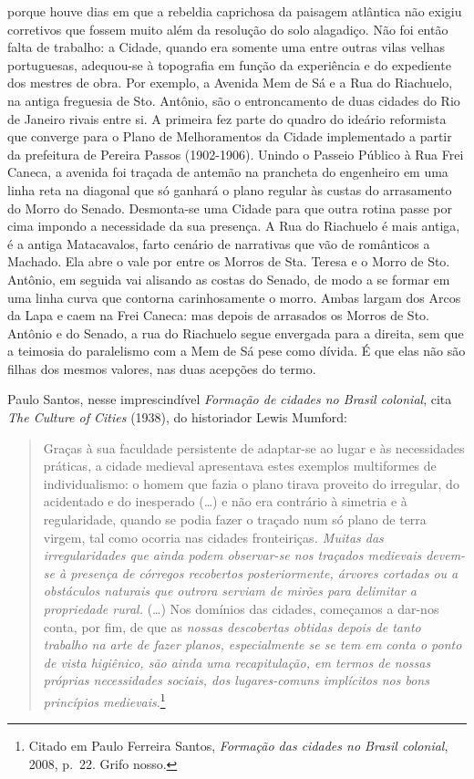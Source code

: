 porque houve dias em que a rebeldia caprichosa da paisagem atlântica não
exigiu corretivos que fossem muito além da resolução do solo alagadiço.
Não foi então falta de trabalho: a Cidade, quando era somente uma entre
outras vilas velhas portuguesas, adequou-se à topografia em função da
experiência e do expediente dos mestres de obra. Por exemplo, a Avenida
Mem de Sá e a Rua do Riachuelo, na antiga freguesia de Sto. Antônio, são
o entroncamento de duas cidades do Rio de Janeiro rivais entre si. A
primeira fez parte do quadro do ideário reformista que converge para o
Plano de Melhoramentos da Cidade implementado a partir da prefeitura de
Pereira Passos (1902-1906). Unindo o Passeio Público à Rua Frei Caneca,
a avenida foi traçada de antemão na prancheta do engenheiro em uma linha
reta na diagonal que só ganhará o plano regular às custas do arrasamento
do Morro do Senado. Desmonta-se uma Cidade para que outra rotina passe
por cima impondo a necessidade da sua presença. A Rua do Riachuelo é
mais antiga, é a antiga Matacavalos, farto cenário de narrativas que vão
de românticos a Machado. Ela abre o vale por entre os Morros de Sta.
Teresa e o Morro de Sto. Antônio, em seguida vai alisando as costas do
Senado, de modo a se formar em uma linha curva que contorna
carinhosamente o morro. Ambas largam dos Arcos da Lapa e caem na Frei
Caneca: mas depois de arrasados os Morros de Sto. Antônio e do Senado, a
rua do Riachuelo segue envergada para a direita, sem que a teimosia do
paralelismo com a Mem de Sá pese como dívida. É que elas não são filhas
dos mesmos valores, nas duas acepções do termo.

Paulo Santos, nesse imprescindível \textit{Formação de cidades no Brasil
colonial}, cita \textit{The Culture of Cities} (1938), do historiador
Lewis Mumford:

\begin{quote}
Graças à sua faculdade persistente de adaptar-se ao lugar e às
necessidades práticas, a cidade medieval apresentava estes exemplos
multiformes de individualismo: o homem que fazia o plano tirava proveito
do irregular, do acidentado e do inesperado (\ldots{}) e não era
contrário à simetria e à regularidade, quando se podia fazer o traçado
num só plano de terra virgem, tal como ocorria nas cidades
fronteiriças\textit{. Muitas das irregularidades que ainda podem
observar-se nos traçados medievais devem-se à presença de córregos
recobertos posteriormente, árvores cortadas ou a obstáculos naturais que
outrora serviam de mirões para delimitar a propriedade rural.}
(\ldots{}) Nos domínios das cidades, começamos a dar-nos conta, por fim,
de que as \textit{nossas descobertas obtidas depois de tanto trabalho na
arte de fazer planos, especialmente se se tem em conta o ponto de vista
higiênico, são ainda uma recapitulação, em termos de nossas próprias
necessidades sociais, dos lugares-comuns implícitos nos bons princípios
medievais}.\footnote{Citado em Paulo Ferreira Santos, \textit{Formação das
  cidades no Brasil colonial}, 2008, p.~22. Grifo nosso.}
\end{quote}


